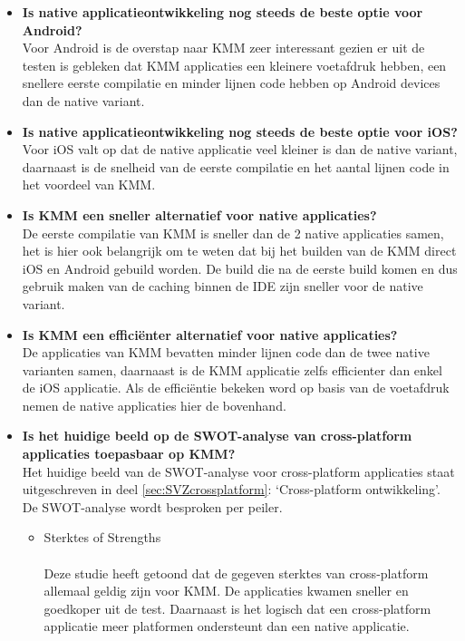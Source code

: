 \begin{itemize}
    \item \textbf{Is native applicatieontwikkeling nog steeds de beste optie voor Android?}\\
    Voor Android is de overstap naar KMM zeer interessant gezien er uit de testen is gebleken dat KMM applicaties een kleinere voetafdruk hebben, een snellere eerste compilatie en minder lijnen code hebben op Android devices dan de native variant.
    \\
    \item \textbf{Is native applicatieontwikkeling nog steeds de beste optie voor iOS?}\\
    Voor iOS valt op dat de native applicatie veel kleiner is dan de native variant, daarnaast is de snelheid van de eerste compilatie en het aantal lijnen code in het voordeel van KMM.
    \\
    \item \textbf{Is KMM een sneller alternatief voor native applicaties?}\\
    De eerste compilatie van KMM is sneller dan de 2 native applicaties samen, het is hier ook belangrijk om te weten dat bij het builden van de KMM direct iOS en Android gebuild worden. De build die na de eerste build komen en dus gebruik maken van de caching binnen de IDE zijn sneller voor de native variant.
    \\
    \item \textbf{Is KMM een efficiënter alternatief voor native applicaties?}\\
    De applicaties van KMM bevatten minder lijnen code dan de twee native varianten samen, daarnaast is de KMM applicatie zelfs efficienter dan enkel de iOS applicatie. Als de efficiëntie bekeken word op basis van de voetafdruk nemen de native applicaties hier de bovenhand.
    \\
    \item \textbf{Is het huidige beeld op de SWOT-analyse van cross-platform applicaties toepasbaar op KMM?}\\
    Het huidige beeld van de SWOT-analyse voor cross-platform applicaties staat uitgeschreven in deel \ref{sec:SVZcrossplatform}: `Cross-platform ontwikkeling'. De SWOT-analyse wordt besproken per peiler.
    \begin{itemize}
        \item Sterktes of Strengths\\
        \\
        Deze studie heeft getoond dat de gegeven sterktes van cross-platform allemaal geldig zijn voor KMM. De applicaties kwamen sneller en goedkoper uit de test. Daarnaast is het logisch dat een cross-platform applicatie meer platformen ondersteunt dan een native applicatie.

\end{itemize}
\end{itemize}
